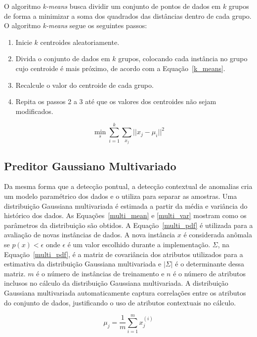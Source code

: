 \documentclass[cic,tc]{iiufrgs}
\begin{document}
O algoritmo \textit{k-means} busca dividir um conjunto de pontos de dados em $k$ grupos de forma a minimizar a soma dos quadrados das distâncias dentro de cada grupo. O algoritmo \textit{k-means} segue os seguintes passos:

\begin{enumerate}
    \item Inicie $k$ centroides aleatoriamente.
    \item Divida o conjunto de dados em $k$ grupos, colocando cada instância no grupo cujo centroide é mais próximo, de acordo com a Equação~\ref{k_means}.
    \item Recalcule o valor do centroide de cada grupo.
    \item Repita os passos 2 a 3 até que os valores dos centroides não sejam modificados.
\end{enumerate}

\begin{equation}
    \label{k_means}
    \min_s \sum_{i=1}^k \sum_{x_j} ||x_j - \mu_i||^2
\end{equation}

\subsection{Preditor Gaussiano Multivariado}
\label{pred_multi}
Da mesma forma que a detecção pontual, a detecção contextual de anomalias cria um modelo paramétrico dos dados e o utiliza para separar as amostras. Uma distribuição Gaussiana multivariada é estimada a partir da média e variância do histórico dos dados. As Equações~\ref{multi_mean} e \ref{multi_var} mostram como os parâmetros da distribuição são obtidos. A Equação~\ref{multi_pdf} é utilizada para a avaliação de novas instâncias de dados. A nova instância $x$ é considerada anômala se $p(x) < \epsilon$ onde $\epsilon$ é um valor escolhido durante a implementação. $\Sigma$, na Equação~\ref{multi_pdf}, é a matriz de covariância dos atributos utilizados para a estimativa da distribuição Gaussiana multivariada e $|\Sigma|$ é o determinante dessa matriz. $m$ é o número de instâncias de treinamento e $n$ é o número de atributos inclusos no cálculo da distribuição Gaussiana multivariada. A distribuição Gaussiana multivariada automaticamente captura correlações entre os atributos do conjunto de dados, justificando o uso de atributos contextuais no cálculo.

\begin{equation}
    \label{multi_mean}
    \mu_j = \frac{1}{m} \sum_{i=1}^{m} x_j^{(i)}
\end{equation}
\end{document}
